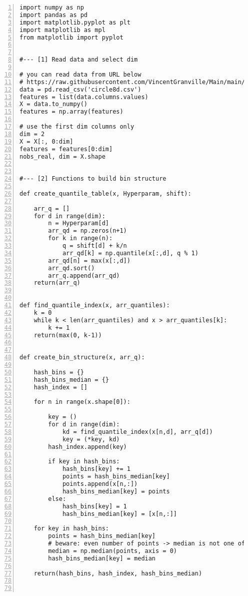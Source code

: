 \documentclass[oneside,10pt]{book}
\begin{document}
\begin{lstlisting}[numbers=left]
import numpy as np
import pandas as pd
import matplotlib.pyplot as plt
import matplotlib as mpl
from matplotlib import pyplot


#--- [1] Read data and select dim 

# you can read data from URL below
# https://raw.githubusercontent.com/VincentGranville/Main/main/circle8d.csv
data = pd.read_csv('circle8d.csv') 
features = list(data.columns.values)
X = data.to_numpy()
features = np.array(features)

# use the first dim columns only
dim = 2
X = X[:, 0:dim] 
features = features[0:dim]
nobs_real, dim = X.shape


#--- [2] Functions to build bin structure

def create_quantile_table(x, Hyperparam, shift):

    arr_q = [] 
    for d in range(dim): 
        n = Hyperparam[d]
        arr_qd = np.zeros(n+1)
        for k in range(n):
            q = shift[d] + k/n
            arr_qd[k] = np.quantile(x[:,d], q % 1)
        arr_qd[n] = max(x[:,d])
        arr_qd.sort()
        arr_q.append(arr_qd)
    return(arr_q)


def find_quantile_index(x, arr_quantiles):
    k = 0
    while k < len(arr_quantiles) and x > arr_quantiles[k]: 
        k += 1
    return(max(0, k-1)) 


def create_bin_structure(x, arr_q):

    hash_bins = {}
    hash_bins_median = {}
    hash_index = []

    for n in range(x.shape[0]):

        key = ()
        for d in range(dim):
            kd = find_quantile_index(x[n,d], arr_q[d])
            key = (*key, kd)        
        hash_index.append(key)

        if key in hash_bins: 
            hash_bins[key] += 1
            points = hash_bins_median[key]
            points.append(x[n,:])
            hash_bins_median[key] = points 
        else:
            hash_bins[key] = 1
            hash_bins_median[key] = [x[n,:]]  

    for key in hash_bins: 
        points = hash_bins_median[key]
        # beware: even number of points -> median is not one of the points  
        median = np.median(points, axis = 0) 
        hash_bins_median[key] = median

    return(hash_bins, hash_index, hash_bins_median)



\end{lstlisting}
\end{document}
